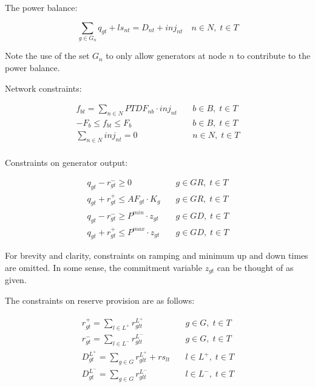 \documentclass[number,times]{elsarticle}
\begin{document}
The power balance:

\begin{equation}
    \sum_{g \in G_n} q_{gt} + ls_{nt} = D_{nt} + inj_{nt} \quad n \in N, \; t \in T
\end{equation}

Note the use of the set $G_n$ to only allow generators at node $n$ to contribute to the power balance.

Network constraints:

\begin{align}
    f_{bt} = \sum_{n \in N} PTDF_{nb} \cdot inj_{nt} & \quad b \in B, \; t \in T \\
    -F_b \leq f_{bt} \leq F_b                        & \quad b \in B, \; t \in T \\
    \sum_{n \in N} inj_{nt} = 0                      & \quad n \in N, \; t \in T \\
\end{align}

Constraints on generator output:

\begin{align}
    q_{gt} - r^{-}_{gt} \geq 0                    & \quad g \in GR, \; t \in T \\
    q_{gt} + r^{+}_{gt} \leq AF_{gt} \cdot K_g    & \quad g \in GR, \; t \in T \\
    q_{gt} - r^{-}_{gt} \geq P^{min} \cdot z_{gt} & \quad g \in GD, \; t \in T \\
    q_{gt} + r^{+}_{gt} \leq P^{max} \cdot z_{gt} & \quad g \in GD, \; t \in T
\end{align}

For brevity and clarity, constraints on ramping and minimum up and down times are omitted. In some sense, the commitment variable $z_{gt}$ can be thought of as given.

The constraints on reserve provision are as follows:

\begin{align}
    r^{+}_{gt} = \sum_{l \in L^+} r^{L^+}_{glt}           & \quad g \in G, \; t \in T   \\
    r^{-}_{gt} = \sum_{l \in L^-} r^{L^-}_{glt}           & \quad g \in G, \; t \in T   \\
    D^{L^+}_{gt} = \sum_{g \in G} r^{L^+}_{glt} + rs_{lt} & \quad l \in L^+, \; t \in T \\
    D^{L^-}_{gt} = \sum_{g \in G} r^{L^-}_{glt}           & \quad l \in L^-, \; t \in T \\
\end{align}
\end{document}

